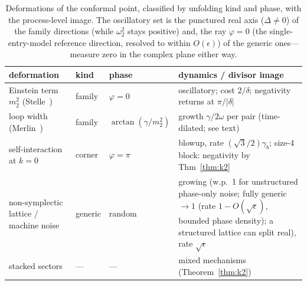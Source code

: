 ﻿\documentclass[11pt]{article}
\theoremstyle{remark}
\begin{document}
\begin{table}[t]
\centering\small
\begin{tabular}{@{}>{\raggedright\arraybackslash}p{}>{\raggedright\arraybackslash}p{}>{\raggedright\arraybackslash}p{}>{\raggedright\arraybackslash}p{}@{}}
\toprule
deformation & kind & phase & dynamics / divisor image\\
\midrule
Einstein term $m_2^2$ (Stelle~\cite{Stelle1977}) & family &
$\varphi=0$ &
oscillatory; cost $2/\delta$; negativity returns at $\pi/|\delta|$\\
loop width (Merlin~\cite{DonoghueMenezes}) & family &
$\arctan(\gamma/m_2^2)$ & growth $\gamma/2\omega$ per pair
(time-dilated; see text)\\
self-interaction at $k=0$~\cite{IK2014} & corner & $\varphi=\pi$ &
blowup, rate $(\sqrt3/2)\gamma_b$; size-4 block: negativity by
Thm~\ref{thm:k2}\\
non-symplectic lattice / machine noise & generic & random & growing (w.p.\ 1 for unstructured phase-only noise; fully generic $\to1$ (rate $1-O(\sqrt\epsilon)$, bounded phase density); a structured lattice can split real), rate
$\sqrt\epsilon$\\
stacked sectors~\cite{Smilga2014} & --- & --- & mixed mechanisms
(Theorem~\ref{thm:k2})\\
\bottomrule
\end{tabular}
\caption{Deformations of the conformal point, classified by
unfolding kind and phase, with the process-level image. The
oscillatory set is the punctured real axis ($\Delta\neq0$) of the family directions (while
$\omega_2^2$ stays positive) and, the ray $\varphi=0$ (the
single-entry-model reference direction, resolved to within $O(\epsilon)$) of the
generic ones---measure zero in the complex plane either way.}
\label{tab:dictionary}
\end{table}
\end{document}
